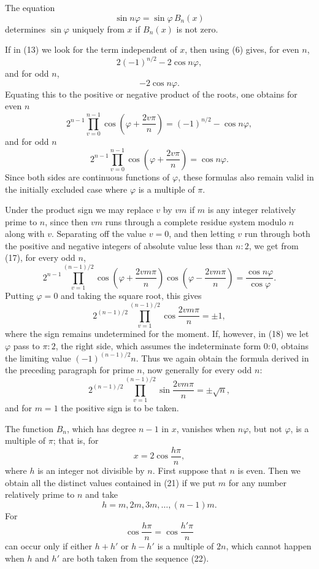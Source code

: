 \documentclass[11pt]{article}
\begin{document}
The equation
\[
\tag{15}       \sin n\varphi=\sin\varphi\,B_n(x)
\]
determines $\sin\varphi$ uniquely from $x$ if $B_n(x)$ is not zero.

If in (13) we look for the term independent of $x$, then using (6) gives, for even $n$,
\[
        2(-1)^{n/2}-2\cos n\varphi,
\]
and for odd $n$,
\[
        -2\cos n\varphi.
\]
Equating this to the positive or negative product of the roots, one obtains for even $n$
\[
\tag{16}       2^{n-1}\prod_{v=0}^{n-1}\cos\left(\varphi+\frac{2v\pi}{n}\right)
        =(-1)^{n/2}-\cos n\varphi,
\]
and for odd $n$
\[
\tag{17}       2^{n-1}\prod_{v=0}^{n-1}\cos\left(\varphi+\frac{2v\pi}{n}\right)
        =\cos n\varphi.
\]
Since both sides are continuous functions of $\varphi$, these formulas also remain valid in the initially excluded case where $\varphi$ is a multiple of $\pi$.

Under the product sign we may replace $v$ by $vm$ if $m$ is any integer relatively prime to $n$, since then $vm$ runs through a complete residue system modulo $n$ along with $v$. Separating off the value $v=0$, and then letting $v$ run through both the positive and negative integers of absolute value less than $n:2$, we get from (17), for every odd $n$,
\[
\tag{18}       2^{n-1}\prod_{v=1}^{(n-1)/2}
\cos\left(\varphi+\frac{2vm\pi}{n}\right)
\cos\left(\varphi-\frac{2vm\pi}{n}\right)
=\frac{\cos n\varphi}{\cos\varphi}.
\]
Putting $\varphi=0$ and taking the square root, this gives
\[
\tag{19}       2^{(n-1)/2}\prod_{v=1}^{(n-1)/2}\cos\frac{2vm\pi}{n}=\pm1,
\]
where the sign remains undetermined for the moment. If, however, in (18) we let $\varphi$ pass to $\pi:2$, the right side, which assumes the indeterminate form $0:0$, obtains the limiting value $(-1)^{(n-1)/2}n$. Thus we again obtain the formula derived in the preceding paragraph for prime $n$, now generally for every odd $n$:
\[
\tag{20}       2^{(n-1)/2}\prod_{v=1}^{(n-1)/2}\sin\frac{2vm\pi}{n}=\pm\sqrt n,
\]
and for $m=1$ the positive sign is to be taken.

The function $B_n$, which has degree $n-1$ in $x$, vanishes when $n\varphi$, but not $\varphi$, is a multiple of $\pi$; that is, for
\[
\tag{21}       x=2\cos\frac{h\pi}{n},
\]
where $h$ is an integer not divisible by $n$. First suppose that $n$ is even. Then we obtain all the distinct values contained in (21) if we put $m$ for any number relatively prime to $n$ and take
\[
\tag{22}       h=m,2m,3m,\ldots,(n-1)m.
\]
For
\[
        \cos\frac{h\pi}{n}=\cos\frac{h'\pi}{n}
\]
can occur only if either $h+h'$ or $h-h'$ is a multiple of $2n$, which cannot happen when $h$ and $h'$ are both taken from the sequence (22).
\end{document}
